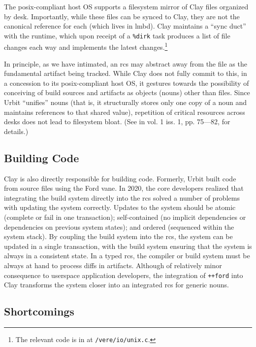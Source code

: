 \documentclass[twoside]{article}
\begin{document}
The {\sc posix}-compliant host OS supports a filesystem mirror of Clay files organized by desk.  Importantly, while these files can be synced to Clay, they are not the canonical reference for each (which lives in {\sc lmbd}).  Clay maintains a ``sync duct'' with the runtime, which upon receipt of a \lstinline[style=inlinecode]{%dirk} task produces a list of file changes each way and implements the latest changes.\footnote{The relevant code is in  at \lstinline[style=inlinecode]{/vere/io/unix.c}.}

In principle, as we have intimated, an {\sc rcs} may abstract away from the file as the fundamental artifact being tracked.  While Clay does not fully commit to this, in a concession to its {\sc posix}-compliant host OS, it gestures towards the possibility of conceiving of build sources and artifacts as objects (nouns) other than files.  Since Urbit ``unifies'' nouns (that is, it structurally stores only one copy of a noun and maintains references to that shared value), repetition of critical resources across desks does not lead to filesystem bloat.  (See \citet{Blackman2024a} in  vol. 1 iss. 1, pp. 75—82, for details.)

\subsection{Building Code}

\sloppy
Clay is also directly responsible for building code.  Formerly, Urbit built code from source files using the Ford vane.  In 2020, the core developers realized that integrating the build system directly into the {\sc rcs} solved a number of problems with updating the system correctly.  Updates to the system should be atomic (complete or fail in one transaction); self-contained (no implicit dependencies or dependencies on previous system states); and ordered (sequenced within the system stack).  By coupling the build system into the {\sc rcs}, the system can be updated in a single transaction, with the build system ensuring that the system is always in a consistent state.  In a typed {\sc rcs}, the compiler or build system must be always at hand to process diffs in artifacts.  Although of relatively minor consequence to userspace application developers, the integration of \lstinline[style=inlinecode]{++ford} into Clay transforms the system closer into an integrated {\sc rcs} for generic nouns.

\subsection{Shortcomings}
\end{document}
